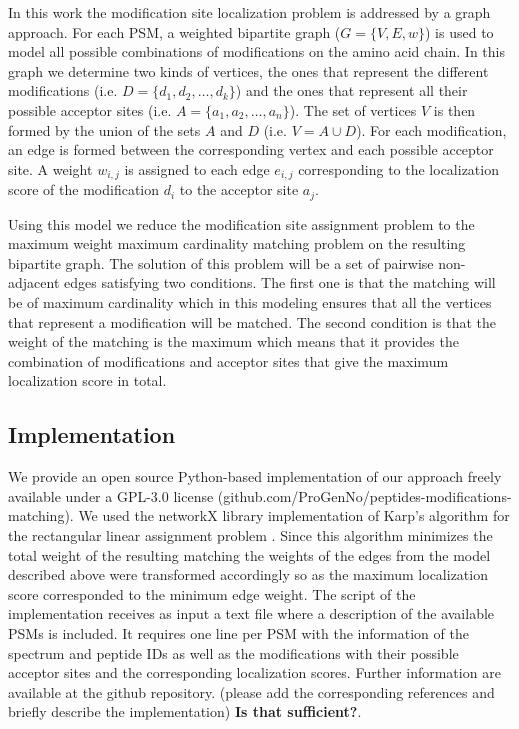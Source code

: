 \documentclass[]{article}
\begin{document}
In this work the modification site localization problem is addressed by a graph approach. For each PSM, a weighted  bipartite graph ($G = \{V,E,w\}$) is used to model all possible combinations of modifications on the amino acid chain. In this graph we determine two kinds of vertices, the ones that represent the different modifications (i.e. $D = \{d_1, d_2, \dots, d_k\}$) and the ones that represent all their possible acceptor sites (i.e. $A = \{a_1, a_2, \dots, a_n\}$). The set of vertices $V$ is then formed by the union of the sets $A$ and $D$ (i.e. $V = A \cup D$). For each modification, an edge is formed between the corresponding vertex and each possible acceptor site. A weight $w_{i,j}$ is assigned to each edge $e_{i,j}$ corresponding to the localization score of the modification $d_i$ to the acceptor site $a_j$.

Using this model we reduce the modification site assignment problem to the  maximum weight maximum cardinality matching problem on the resulting bipartite graph. The solution of this problem will be a set of pairwise non-adjacent edges satisfying two conditions. The first one is that the matching will be of maximum cardinality which in this modeling ensures that all the vertices that represent a modification will be matched. The second condition is that the weight of the matching is the maximum which means that it provides the combination of modifications and acceptor sites that give the maximum localization score in total.


\subsection{Implementation}

We provide an open source Python-based implementation of our approach freely available under a GPL-3.0 license (github.com/ProGenNo/peptides-modifications-matching). We used the networkX library implementation of Karp's algorithm for the rectangular linear assignment problem \cite{Karp_assignment}. Since this algorithm minimizes the total weight of the resulting matching the weights of the edges from the model described above were transformed accordingly so as the maximum localization score corresponded to the minimum edge weight. The script of the implementation receives as input a text file where a description of the available PSMs is included. It requires one line per PSM with the information of the spectrum and peptide IDs as well as the modifications with their possible acceptor sites and the corresponding localization scores. Further information are available at the github repository.  \alert{(please add the corresponding references and briefly describe the implementation) \textbf{Is that sufficient?}}.
\end{document}
